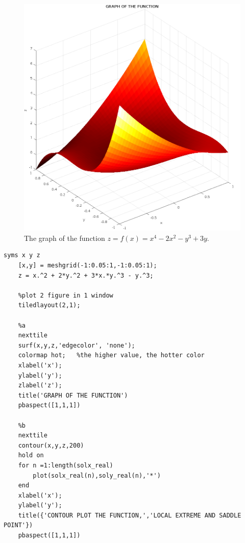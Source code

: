\begin{figure}[H]
  \centering
  \includegraphics[width=12cm]{graphics/1a.png}
  \caption{The graph of the function $ z = f(x) = x^4 - 2x^2 - y^3 + 3y $.}
\end{figure}

\begin{lstlisting}[style=Matlab-editor]
    syms x y z
    [x,y] = meshgrid(-1:0.05:1,-1:0.05:1);
    z = x.^2 + 2*y.^2 + 3*x.*y.^3 - y.^3;

    %plot 2 figure in 1 window
    tiledlayout(2,1);

    %a
    nexttile
    surf(x,y,z,'edgecolor', 'none');
    colormap hot;   %the higher value, the hotter color
    xlabel('x');
    ylabel('y');
    zlabel('z');
    title('GRAPH OF THE FUNCTION')
    pbaspect([1,1,1])

    %b
    nexttile
    contour(x,y,z,200)
    hold on
    for n =1:length(solx_real)
        plot(solx_real(n),soly_real(n),'*')
    end
    xlabel('x');
    ylabel('y');
    title({'CONTOUR PLOT THE FUNCTION,','LOCAL EXTREME AND SADDLE POINT'})
    pbaspect([1,1,1])
\end{lstlisting}

